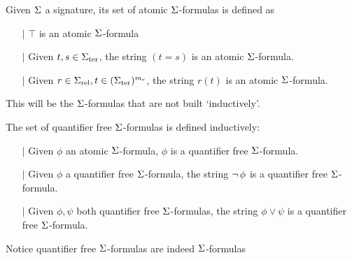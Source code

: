 \begin{dfn}%
    Given $\Sigma$ a signature, 
    its set of atomic $\Sigma$-formulas is defined as
    \begin{itemize}
        \item[$\vert$] $\top$ is an atomic $\Sigma$-formula
        \item[$\vert$] Given $t, s \in {\Sigma}_\mathrm{ter}$, 
        the string $(t = s)$ is an atomic $\Sigma$-formula.
        \item[$\vert$] Given $r \in {\Sigma}_\mathrm{rel}, t \in ({\Sigma}_\mathrm{ter})^{m_r}$, 
        the string $r(t)$ is an atomic $\Sigma$-formula.
    \end{itemize}
    This will be the $\Sigma$-formulas that are not built `inductively'.

    The set of quantifier free $\Sigma$-formulas is defined inductively:
    \begin{itemize}
        \item[$\vert$] Given $\phi$ an atomic $\Sigma$-formula,
            $\phi$ is a quantifier free $\Sigma$-formula.
        \item[$\vert$] Given $\phi$ a quantifier free $\Sigma$-formula, 
        the string $\neg\, \phi$ is a quantifier free $\Sigma$-formula. 
        \item[$\vert$] Given $\phi, \psi$ both quantifier free $\Sigma$-formulas, 
        the string $\phi \lor \psi$ is a quantifier free $\Sigma$-formula.
    \end{itemize}
    Notice quantifier free $\Sigma$-formulas are indeed $\Sigma$-formulas
\end{dfn}

